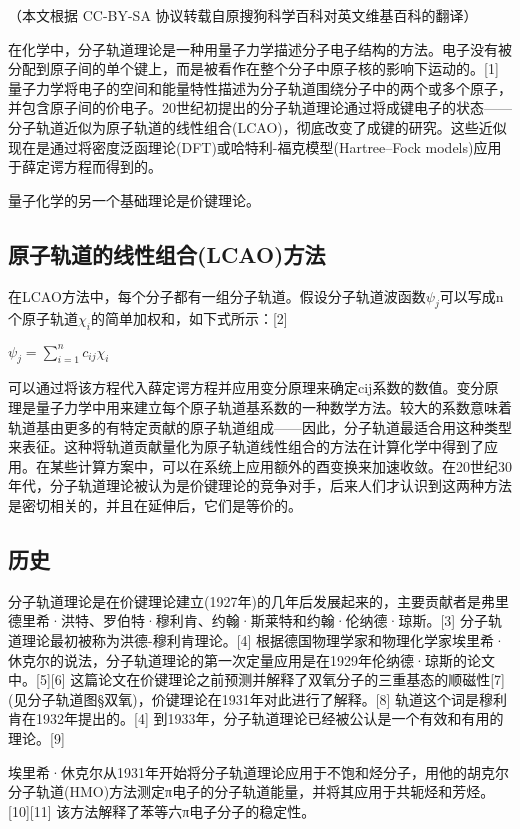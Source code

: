 
（本文根据 CC-BY-SA 协议转载自原搜狗科学百科对英文维基百科的翻译）

在化学中，分子轨道理论是一种用量子力学描述分子电子结构的方法。电子没有被分配到原子间的单个键上，而是被看作在整个分子中原子核的影响下运动的。[1] 量子力学将电子的空间和能量特性描述为分子轨道围绕分子中的两个或多个原子，并包含原子间的价电子。20世纪初提出的分子轨道理论通过将成键电子的状态——分子轨道近似为原子轨道的线性组合(LCAO)，彻底改变了成键的研究。这些近似现在是通过将密度泛函理论(DFT)或哈特利-福克模型(Hartree–Fock models)应用于薛定谔方程而得到的。

量子化学的另一个基础理论是价键理论。

\subsection{原子轨道的线性组合(LCAO)方法}

在LCAO方法中，每个分子都有一组分子轨道。假设分子轨道波函数$\psi_j$可以写成n个原子轨道$\chi_i$的简单加权和，如下式所示：[2]

 $\psi_j = \sum_{i=1}^{n} c_{ij} \chi_i$


可以通过将该方程代入薛定谔方程并应用变分原理来确定cij系数的数值。变分原理是量子力学中用来建立每个原子轨道基系数的一种数学方法。较大的系数意味着轨道基由更多的有特定贡献的原子轨道组成——因此，分子轨道最适合用这种类型来表征。这种将轨道贡献量化为原子轨道线性组合的方法在计算化学中得到了应用。在某些计算方案中，可以在系统上应用额外的酉变换来加速收敛。在20世纪30年代，分子轨道理论被认为是价键理论的竞争对手，后来人们才认识到这两种方法是密切相关的，并且在延伸后，它们是等价的。

\subsection{历史}

分子轨道理论是在价键理论建立(1927年)的几年后发展起来的，主要贡献者是弗里德里希·洪特、罗伯特·穆利肯、约翰·斯莱特和约翰·伦纳德·琼斯。[3] 分子轨道理论最初被称为洪德-穆利肯理论。[4] 根据德国物理学家和物理化学家埃里希·休克尔的说法，分子轨道理论的第一次定量应用是在1929年伦纳德·琼斯的论文中。[5][6] 这篇论文在价键理论之前预测并解释了双氧分子的三重基态的顺磁性[7] (见分子轨道图§双氧)，价键理论在1931年对此进行了解释。[8] 轨道这个词是穆利肯在1932年提出的。[4] 到1933年，分子轨道理论已经被公认是一个有效和有用的理论。[9]

埃里希·休克尔从1931年开始将分子轨道理论应用于不饱和烃分子，用他的胡克尔分子轨道(HMO)方法测定π电子的分子轨道能量，并将其应用于共轭烃和芳烃。[10][11] 该方法解释了苯等六π电子分子的稳定性。

